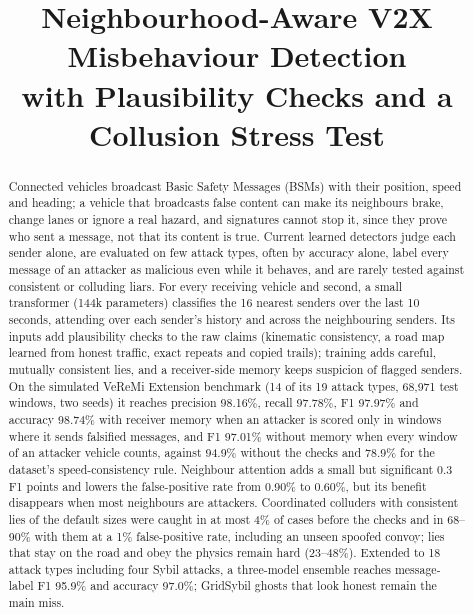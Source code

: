 \documentclass[conference]{IEEEtran}
\begin{document}
\title{Neighbourhood-Aware V2X Misbehaviour Detection\\with Plausibility Checks and a Collusion Stress Test}

\author{
}

\maketitle

\begin{abstract}
Connected vehicles broadcast Basic Safety Messages (BSMs) with their position, speed and heading; a vehicle that broadcasts false content can make
its neighbours brake, change lanes or ignore a real hazard, and signatures cannot stop it, since they prove who sent a message, not that its
content is true. Current learned detectors judge each sender alone, are evaluated on few attack types, often by accuracy alone, label every
message of an attacker as malicious even while it behaves, and are rarely tested against consistent or colluding liars.
For every receiving vehicle and second, a small transformer (144k parameters) classifies the 16 nearest senders over the last 10 seconds,
attending over each sender's history and across the neighbouring senders. Its inputs add plausibility checks to the raw claims (kinematic
consistency, a road map learned from honest traffic, exact repeats and copied trails); training adds careful, mutually consistent lies, and a
receiver-side memory keeps suspicion of flagged senders.
On the simulated VeReMi Extension benchmark (14 of its 19 attack types, 68,971 test windows, two seeds) it reaches precision 98.16\%,
recall 97.78\%, F1 97.97\% and accuracy 98.74\% with receiver memory when an attacker is scored only in windows where it sends falsified
messages, and F1 97.01\% without memory when every window of an attacker vehicle counts, against 94.9\% without the checks and 78.9\% for the
dataset's speed-consistency rule. Neighbour attention adds a small but significant 0.3 F1 points and lowers the false-positive rate from 0.90\%
to 0.60\%, but its benefit disappears when most neighbours are attackers. Coordinated colluders with consistent lies of the default sizes were caught in at most 4\%
of cases before the checks and in 68--90\% with them at a 1\% false-positive rate, including an unseen spoofed convoy; lies that stay on the road
and obey the physics remain hard (23--48\%). Extended to 18 attack types including four Sybil attacks, a three-model ensemble reaches
message-label F1 95.9\% and accuracy 97.0\%; GridSybil ghosts that look honest remain the main miss.
\end{abstract}
\end{document}
